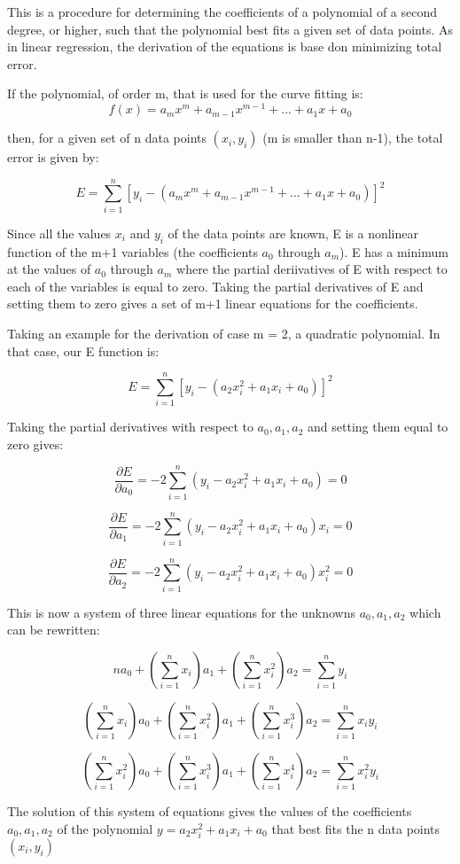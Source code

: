 \documentclass{article}
\begin{document}
This is a procedure for determining the coefficients of a polynomial of a second degree, or higher, such that the polynomial best fits a given set of data points. As in linear regression, the derivation of the equations is base don minimizing total error.

If the polynomial, of order m, that is used for the curve fitting is:
\[f(x) = a_mx^m + a_{m-1}x^{m-1} + ... + a_1x + a_0\]

then, for a given set of n data points $(x_i, y_i)$ (m is smaller than n-1), the total error is given by:

\[E =  \sum^{n}_{i=1}[y_i - (a_mx^m + a_{m-1}x^{m-1} + ... + a_1x + a_0)]^2\]

Since all the values $x_i$ and $y_i$ of the data points are known, E is a nonlinear function of the m+1 variables (the coefficients $a_0$ through $a_m$). E has a minimum at the values of $a_0$ through $a_m$ where the partial deriivatives of E with respect to each of the variables is equal to zero. Taking the partial derivatives of E and setting them to zero gives a set of m+1 linear equations for the coefficients.


Taking an example for the derivation of case m = 2, a quadratic polynomial.
In that case, our E function is:

\[E =  \sum^{n}_{i=1}[y_i - (a_2x_i^2 + a_{1}x_i + a_0)]^2\]

Taking the partial derivatives with respect to $a_0, a_1, a_2$ and setting them equal to zero gives:

\[\frac{\partial E}{\partial a_0} = -2\sum^{n}_{i=1}(y_i - a_2x_i^2 + a_{1}x_i + a_0) = 0 \]

\[\frac{\partial E}{\partial a_1} = -2\sum^{n}_{i=1}(y_i - a_2x_i^2 + a_{1}x_i + a_0)x_i = 0 \]

\[\frac{\partial E}{\partial a_2} = -2\sum^{n}_{i=1}(y_i - a_2x_i^2 + a_{1}x_i + a_0)x_i^2 = 0 \]

This is now a system of three linear equations for the unknowns $a_0, a_1, a_2$ which can be rewritten:

\[na_0 + (\sum^{n}_{i=1}x_i)a_1 + (\sum^{n}_{i=1}x_i^2)a_2 = \sum^{n}_{i=1}y_i\]

\[(\sum^{n}_{i=1}x_i)a_0 + (\sum^{n}_{i=1}x_i^2)a_1 + (\sum^{n}_{i=1}x_i^3)a_2 = \sum^{n}_{i=1}x_iy_i\]

\[(\sum^{n}_{i=1}x_i^2)a_0 + (\sum^{n}_{i=1}x_i^3)a_1 + (\sum^{n}_{i=1}x_i^4)a_2 = \sum^{n}_{i=1}x_i^2y_i\]

The solution of this system of equations gives the values of the coefficients $a_0, a_1, a_2$ of the polynomial $ y = a_2x_i^2 + a_1x_i + a_0$ that best fits the n data points $(x_i, y_i)$
\end{document}
